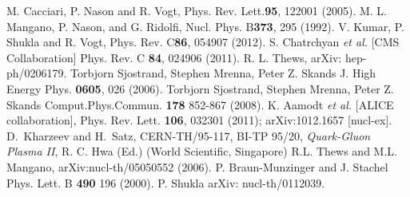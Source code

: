 \documentclass[aps,prc,preprint,superscriptaddress,showpacs,showkeys]{revtex4-1}
\begin{document}
\begin{thebibliography}{100}
 M. Cacciari, P. Nason and R. Vogt, Phys. Rev. Lett.{\bf 95}, 122001 (2005).
 M. L. Mangano, P. Nason, and G. Ridolfi, Nucl. Phys. B{\bf 373}, 295 (1992).
 V. Kumar, P. Shukla and R. Vogt, Phys. Rev. C{\bf 86}, 054907 (2012).
 S. Chatrchyan {\it et al.} [CMS Collaboration] Phys. Rev. C {\bf 84}, 024906 (2011).
R. L. Thews, arXiv: hep-ph/0206179.
 Torbjorn Sjostrand, Stephen Mrenna, Peter Z. Skands J. High Energy Phys. {\bf 0605}, 026 (2006). 
 Torbjorn Sjostrand, Stephen Mrenna, Peter Z. Skands Comput.Phys.Commun. {\bf 178} 852-867 (2008).
 K. Aamodt {\it et al.} [ALICE collaboration], Phys. Rev. Lett. {\bf 106}, 032301 (2011);
          arXiv:1012.1657 [nucl-ex].
D.~Kharzeev and H.~Satz, CERN-TH/95-117, BI-TP 95/20,
         {\it Quark-Gluon Plasma II}, R. C. Hwa (Ed.) (World Scientific, Singapore)
 R.L. Thews and M.L. Mangano, arXiv:nucl-th/05050552 (2006).
 P. Braun-Munzinger and J. Stachel Phys. Lett. B {\bf 490} 196 (2000).
 P. Shukla arXiv: nucl-th/0112039. 
\end{thebibliography}
\end{document}
